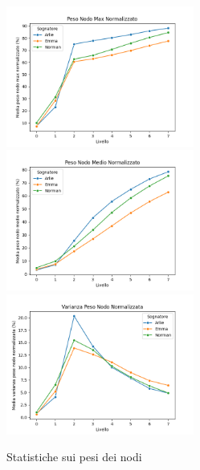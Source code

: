 \begin{figure}
    \includegraphics[width=0.55\textwidth]{Immagini/peso_nodo_max_normalizzato}
    \includegraphics[width=0.55\textwidth]{Immagini/peso_nodo_medio_normalizzato}
    \includegraphics[width=0.55\textwidth]{Immagini/varianza_peso_nodo_normalizzata}
    \caption{Statistiche sui pesi dei nodi}\label{fig:node_weight}
\end{figure}

